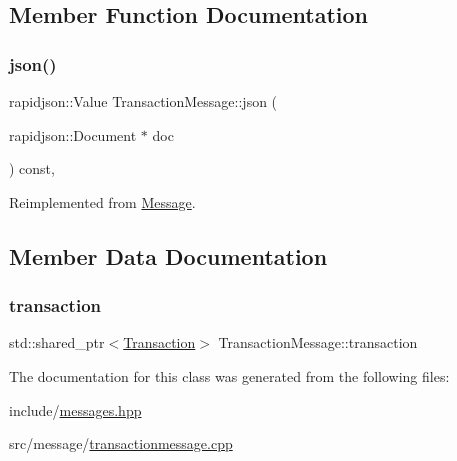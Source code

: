 \subsection{Member Function Documentation}
\mbox{\label{classTransactionMessage_af8675087bd26b6aa0c30a3e3141dda4e}} 
\subsubsection{\texorpdfstring{json()}{json()}}
{\footnotesize\ttfamily rapidjson\+::\+Value Transaction\+Message\+::json (\begin{DoxyParamCaption}\item[{rapidjson\+::\+Document $\ast$}]{doc }\end{DoxyParamCaption}) const\hspace{0.3cm}{\ttfamily [override]}, {\ttfamily [virtual]}}



Reimplemented from \mbox{\hyperlink{classMessage_a6f8e3ac2eed3a8afe9400fcd5b3447b2}{Message}}.



\subsection{Member Data Documentation}
\mbox{\label{classTransactionMessage_a5949ed4449ab8031ffc6342268b981ff}} 
\subsubsection{\texorpdfstring{transaction}{transaction}}
{\footnotesize\ttfamily std\+::shared\+\_\+ptr$<$\mbox{\hyperlink{classTransaction}{Transaction}}$>$ Transaction\+Message\+::transaction\hspace{0.3cm}{\ttfamily [private]}}



The documentation for this class was generated from the following files\+:\begin{DoxyCompactItemize}
\item 
include/\mbox{\hyperlink{messages_8hpp}{messages.\+hpp}}\item 
src/message/\mbox{\hyperlink{transactionmessage_8cpp}{transactionmessage.\+cpp}}\end{DoxyCompactItemize}
